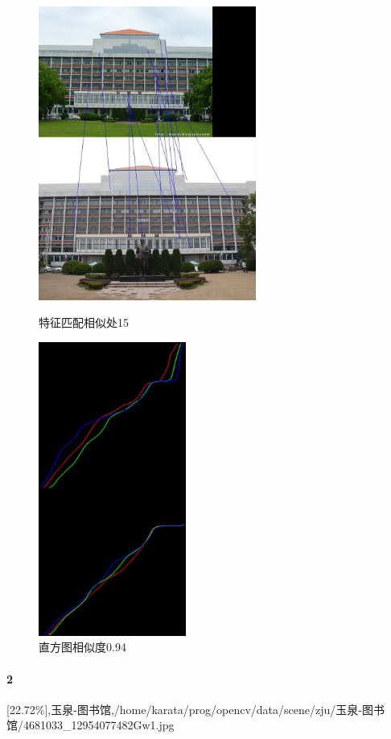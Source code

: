 \begin{figure}[htb]
\begin{minipage}[t]{0.5\linewidth}
\centering
\includegraphics[height=3.8in]{玉泉图书馆.jpg.d/im1sift.jpg}
\caption{特征匹配相似处15}
\label{fig:side:a}
\end{minipage}%
\begin{minipage}[t]{0.5\linewidth}
\centering
\includegraphics[height=3.8in]{玉泉图书馆.jpg.d/im1hist2.jpg}
\caption{直方图相似度0.94}
\label{fig:side:a}
\end{minipage}%
\end{figure}

\clearpage
\paragraph{2}
[22.72\%],玉泉-图书馆,/home/karata/prog/opencv/data/scene/zju/玉泉-图书馆/4681033_12954077482Gw1.jpg

